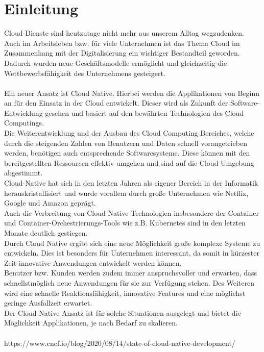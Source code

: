 \chapter{Einleitung}
Cloud-Dienste sind heutzutage nicht mehr aus unserem Alltag wegzudenken. Auch im Arbeitsleben bzw. für viele Unternehmen ist das Thema Cloud im Zusammenhang mit der Digitalisierung ein wichtiger Bestandteil geworden. Dadurch wurden neue Geschäftsmodelle ermöglicht und gleichzeitig die Wettbewerbsfähigkeit des Unternehmens gesteigert.\\
\\
Ein neuer Ansatz ist Cloud Native. Hierbei werden die Applikationen von Beginn an für den Einsatz in der Cloud entwickelt. Dieser wird als Zukunft der Software-Entwicklung gesehen und basiert auf den bewährten Technologien des Cloud Computings.\\
Die Weiterentwicklung und der Ausbau des Cloud Computing Bereiches, welche durch die steigenden Zahlen von Benutzern und Daten schnell vorangetrieben werden, benötigen auch entsprechende Softwaresysteme. Diese können mit den bereitgestellten Ressourcen effektiv umgehen und sind auf die Cloud Umgebung abgestimmt.\\
Cloud-Native hat sich in den letzten Jahren als eigener Bereich in der Informatik herauskristallisiert und wurde vorallem durch große Unternehmen wie Netflix, Google und Amazon geprägt.\\
Auch die Verbreitung von Cloud Native Technologien insbesondere der Container und Container-Orchestrierungs-Tools wie z.B. Kubernetes sind in den letzten Monate deutlich gestiegen.\\
Durch Cloud Native ergibt sich eine neue Möglichkeit große komplexe Systeme zu entwickeln. Dies ist besonders für Unternehmen interessant, da somit in kürzester Zeit innovative Anwendungen entwickelt werden können.\\
Benutzer bzw. Kunden werden zudem immer anspruchsvoller und erwarten, dass schnellstmöglich neue Anwendungen für sie zur Verfügung stehen. Des Weiteren wird eine schnelle Reaktionsfähigkeit, innovative Features und eine möglichst geringe Ausfallzeit erwartet.\\
Der Cloud Native Ansatz ist für solche Situationen ausgelegt und bietet die Möglichkeit Applikationen, je nach Bedarf zu skalieren.\\
\\

https://www.cncf.io/blog/2020/08/14/state-of-cloud-native-development/